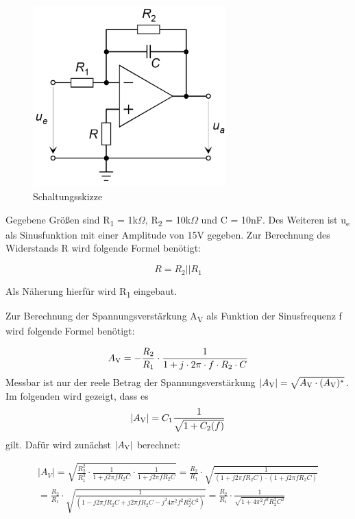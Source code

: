 \begin{figure}[H]
    \centering
    \includegraphics[height=7cm]{images/Versuch6/Schaltungsskizze.jpeg} 
    \caption{Schaltungsskizze}
    \label{fig: Schaltungsskizze}
\end{figure}
Gegebene Größen sind R\textsubscript{1} = 1k$\Omega$,
R\textsubscript{2} = 10k$\Omega$ und C = 10nF.
Des Weiteren ist u\textsubscript{e} als Sinusfunktion mit einer
Amplitude von 15V gegeben.
Zur Berechnung des Widerstands R wird folgende Formel benötigt:

\begin{equation}
    R = R_2|| R_1
    \label{eq:R}
\end{equation}

Als Näherung hierfür wird R\textsubscript{1} eingebaut.

Zur Berechnung der Spannungsverstärkung A\textsubscript{V} als
Funktion der Sinusfrequenz f wird folgende Formel benötigt:

\begin{equation}
    A\textsubscript{V} = -\frac{R_2}{R_1} \cdot \frac{1}{1 + j \cdot 2 \pi \cdot f \cdot R_2 \cdot C}
    \label{eq:AV}
\end{equation}
Messbar ist nur der reele Betrag der Spannungsverstärkung  
$|A\textsubscript{V}| = \sqrt{A\textsubscript{V} \cdot (A\textsubscript{V})^{*}} $.
Im folgenden wird gezeigt, dass es
\begin{equation}
    |A\textsubscript{V}| = C_1\frac{1}{\sqrt{1 + C_2(f)}}
    \label{eq:AV2}
\end{equation} 
gilt. Dafür wird zunächst 
$|A\textsubscript{V}|$ berechnet:

\[
    \begin{aligned}
    |A_V| = \sqrt{\frac{R_2^2}{R_1^2} \cdot \frac{1}{1 + j 2 \pi f R_2 C} \cdot \frac{1}{1 + j 2 \pi f R_2 C}}
    = \frac{R_2}{R_1} \cdot \sqrt{\frac{1}{(1 + j 2 \pi f R_2 C) \cdot (1 + j 2 \pi f R_2 C)}} \\
    = \frac{R_2}{R_1} \cdot \sqrt{\frac{1}{(1 - j 2 \pi f R_2 C + j 2 \pi f R_2 C - j^2 4 \pi^2 f^2 R_2 ^ 2 C^2)}}
    = \frac{R_2}{R_1} \cdot \frac{1}{\sqrt{1 + 4 \pi^2 f^2 R_2 ^ 2 C^2}} \\
    \end{aligned}
\]

